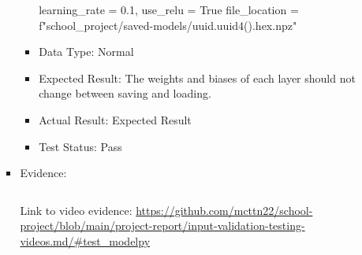 \documentclass[./project-report/src/latex/project-report.tex]{subfiles}
\begin{document}
\begin{itemize}
\begin{itemize}
\begin{itemize}
\begin{itemize}
                            learning\_rate = 0.1, \newline
                            use\_relu = True
							file\_location = f"school\_project/saved-models/{uuid.uuid4().hex}.npz"
						\item Data Type: Normal
						\item Expected Result: The weights and biases of each layer should not change between saving and loading.
						\item Actual Result: Expected Result
						\item Test Status: Pass
					\end{itemize}
					\item Evidence:
						\inputminted{python}{./school_project/test/models/cpu/utils/test_model.py}
						\begin{figure}[h!]
						\centering
						\end{figure}
	
						Link to video evidence: \url{https://github.com/mcttn22/school-project/blob/main/project-report/input-validation-testing-videos.md/#test_modelpy}

						\pagebreak


\end{itemize}
\end{itemize}
\end{itemize}
\end{document}
